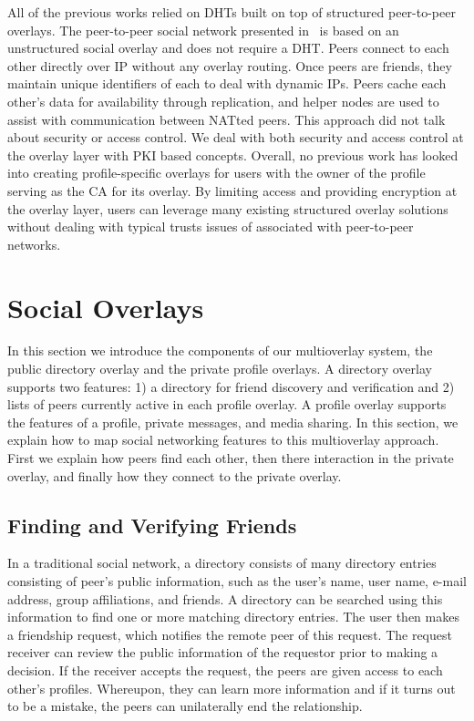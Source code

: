 \documentclass[letterpaper,twocolumn,10pt]{article}
\begin{document}
All of the previous works relied on DHTs built on top of structured 
peer-to-peer overlays. The peer-to-peer social network presented
in~\cite{tribler-osn} is based on an unstructured social overlay
and does not require a DHT. Peers connect to each other directly over IP
without any overlay routing. Once peers are friends, they maintain
unique identifiers of each to deal with dynamic IPs. Peers cache each
other's data for availability through replication, and helper nodes
are used to assist with communication between NATted peers. This
approach did not talk about security or access control. We deal with
both security and access control at the overlay layer with PKI based
concepts. Overall, no previous work has looked into creating profile-specific
overlays for users with the owner of the profile serving as the CA
for its overlay. By limiting access and providing encryption at the overlay
layer, users can leverage many existing structured overlay solutions without
dealing with typical trusts issues of associated with peer-to-peer networks.

\section{Social Overlays}
\label{social_overlays}
In this section we introduce the components of our multioverlay system,
the public directory overlay and the private profile overlays.  A directory
overlay supports two features:  1) a directory for friend discovery and
verification and 2) lists of peers currently active in each profile overlay.
A profile overlay supports the features of a profile, private messages, and
media sharing.  In this section, we explain how to map social networking
features to this multioverlay approach.  First we explain how peers find
each other, then there interaction in the private overlay, and finally how
they connect to the private overlay.

\subsection{Finding and Verifying Friends}
In a traditional social network, a directory consists of many directory entries
consisting of peer's public information, such as the user's name, user name,
e-mail address, group affiliations, and friends.  A directory can be searched
using this information to find one or more matching directory entries.  The user
then makes a friendship request, which notifies the remote peer of this request.
The request receiver can review the public information of the requestor prior to
making a decision.  If the receiver accepts the request, the peers are given
access to each other's profiles.  Whereupon, they can learn more information
and if it turns out to be a mistake, the peers can unilaterally end the
relationship.
\end{document}
